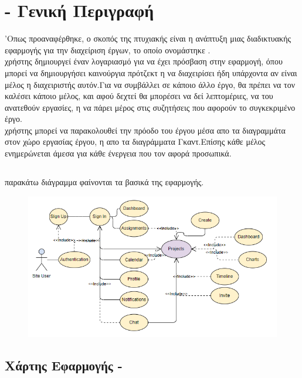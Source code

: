 \section{ - Γενική Περιγραφή}
\pSpace'Οπως προαναφέρθηκε, ο σκοπός της πτυχιακής είναι η ανάπτυξη μιας διαδικτυακής εφαρμογής για την διαχείριση έργων, το οποίο ονομάστηκε .\\
 χρήστης δημιουργεί έναν λογαριασμό για να έχει πρόσβαση στην εφαρμογή, όπου μπορεί να δημιουργήσει καινούργια πρότζεκτ η να διαχειρίσει ήδη υπάρχοντα αν είναι μέλος η διαχειριστής αυτόν.Για να συμβάλλει σε κάποιο άλλο έργο, θα πρέπει να τον καλέσει κάποιο μέλος, και αφού δεχτεί θα μπορέσει να δεί λεπτομέριες, να του ανατεθούν εργασίες, η να πάρει μέρος στις συζητήσεις που αφορούν το συγκεκριμένο έργο.\\
 χρήστης μπορεί να παρακολουθεί την πρόοδο του έργου μέσα απο τα διαγραμμάτα στον χώρο εργασίας έργου, η απο τα διαγράμματα Γκαντ.Επίσης κάθε μέλος ενημερώνεται άμεσα για κάθε ένεργεια που τον αφορά προσωπικά.

\subsection*{}
 παρακάτω  διάγραμμα φαίνονται τα βασικά  της εφαρμογής.
\begin{figure}[ht]
\centering
\includegraphics[scale=1]{images/usecase.jpg}
\caption{}
\label{fig:use_cases}
\end{figure}
\pagebreak

\subsection*{Χάρτης Εφαρμογής - }

